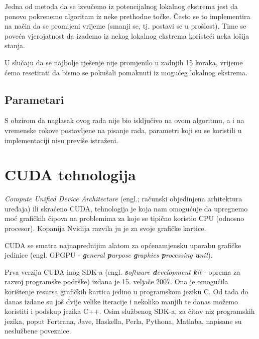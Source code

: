 \documentclass[times, utf8, zavrsni]{fer}
\begin{document}
Jedna od metoda da se izvučemo iz potencijalnog lokalnog ekstrema jest da
ponovo pokrenemo algoritam iz neke prethodne točke. Često se to implementira
na način da se promijeni vrijeme (smanji se, tj. postavi se u prošlost).
Time se poveća vjerojatnost da izađemo iz nekog lokalnog ekstrema koristeći
neka lošija stanja. 

U slučaju da se najbolje rješenje nije promjenilo u zadnjih 15 koraka, 
vrijeme ćemo resetirati da bismo se pokušali pomaknuti iz mogućeg lokalnog
ekstrema. 

\section{Parametari}

S obzirom da naglasak ovog rada nije bio isključivo na ovom algoritmu, 
a i na vremenske rokove postavljene na pisanje rada, parametri koji su se
koristili u implementaciji nisu previše istraženi. 






\chapter{CUDA tehnologija}
\textit{Compute Unified Device Architecture} (engl.; računski objedinjena
arhitektura uređaja) ili skraćeno CUDA, tehnologija je
koja nam omogućuje da upregnemo moć grafičkih čipova na
problemima za koje se tipično koristio CPU (odnosno procesor).
Kopanija Nvidija razvila ju je za svoje grafičke kartice. 

CUDA se smatra najnaprednijim alatom za općenamjensku uporabu
grafičke jedinice (engl. GPGPU - \textit{\textbf{g}eneral
\textbf{p}urpose \textbf{g}raphics \textbf{p}rocessing \textbf{u}nit}).


Prva verzija CUDA-inog SDK-a (engl. \textit{\textbf{s}oftware
\textbf{d}evelopment \textbf{k}it} - oprema za razvoj programske
podrške) izdana je 15. veljače 2007.
Ona je omogućila korištenje resursa grafičkih kartica jedino u
programskom jeziku C. Od tada do danas izdane su još dvije velike
iteracije i nekoliko manjih te danas možemo koristiti i podskup
jezika C++. Osim službenog SDK-a, za čitav niz programskih jezika,
poput Fortrana, Jave, Haskella, Perla, Pythona, Matlaba, napisane su
neslužbene poveznice. 
\end{document}

